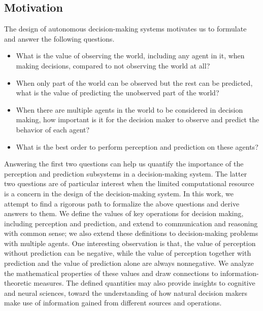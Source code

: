 \documentclass{article}
\newcommand\blfootnote[1]{%
	\begingroup
	\renewcommand\thefootnote{}\footnote{#1}%
	\addtocounter{footnote}{-1}%
	\endgroup
}
\begin{document}
\subsection{Motivation}
The design of autonomous decision-making systems motivates us to formulate and answer the following questions.
\begin{itemize}[leftmargin=*]%
\item
What is the value of observing the world, including any agent in it, when making decisions, compared to not observing the world at all?
\item
When only part of the world can be observed but the rest can be predicted, what is the value of predicting the unobserved part of the world?
\item 
When there are multiple agents in the world to be considered in decision making,
how important is it for the decision maker to observe and predict the behavior of each agent?  
\item
What is the best order to perform perception and prediction on these agents?
\end{itemize} 
Answering the first two questions can help us quantify the importance of the perception and prediction subsystems in a decision-making system.
The latter two questions are of particular interest when the limited computational resource is a concern in the design of the decision-making system.
In this work, we attempt to find a rigorous path to formalize the above questions and derive answers to them.
We define the values of key operations for decision making, including perception and prediction, and extend to communication and reasoning with common sense; we also extend these definitions to decision-making problems with multiple agents.
 One interesting observation is that, the value of perception without prediction can be negative, while the value of perception together with prediction and the value of prediction alone are always nonnegative.
We analyze the mathematical properties of these values and draw connections to information-theoretic measures.
The defined quantities may also provide insights to cognitive and neural sciences, toward the understanding of how natural decision makers make use of information gained from different sources and operations.
\end{document}
